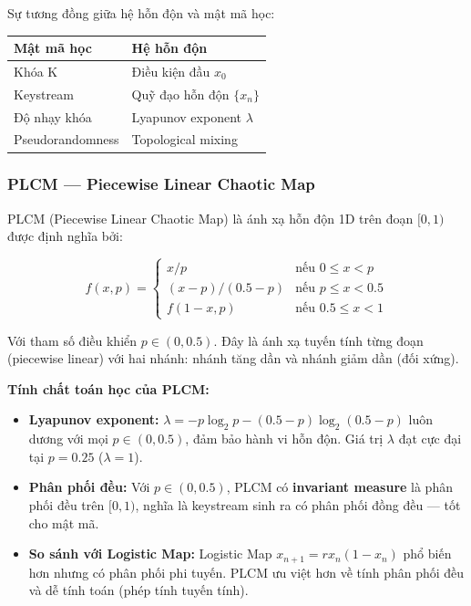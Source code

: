 Sự tương đồng giữa hệ hỗn độn và mật mã học:

\begin{center}
\begin{tabular}{ll}
\toprule
Mật mã học & Hệ hỗn độn \\
\midrule
Khóa K & Điều kiện đầu $x_0$ \\
Keystream & Quỹ đạo hỗn độn $\{x_n\}$ \\
Độ nhạy khóa & Lyapunov exponent $\lambda$ \\
Pseudorandomness & Topological mixing \\
\bottomrule
\end{tabular}
\end{center}

\subsubsection{PLCM --- Piecewise Linear Chaotic Map}

PLCM (Piecewise Linear Chaotic Map) \cite{li_plcm} là ánh xạ hỗn độn 1D trên
đoạn $[0, 1)$ được định nghĩa bởi:

\begin{equation}
f(x, p) = \begin{cases}
  x / p                    & \text{nếu } 0 \leq x < p \\
  (x - p)/(0.5 - p)        & \text{nếu } p \leq x < 0.5 \\
  f(1 - x, p)              & \text{nếu } 0.5 \leq x < 1
\end{cases}
\label{eq:plcm}
\end{equation}

Với tham số điều khiển $p \in (0, 0.5)$. Đây là ánh xạ tuyến tính từng đoạn
(piecewise linear) với hai nhánh: nhánh tăng dần và nhánh giảm dần (đối xứng).

\textbf{Tính chất toán học của PLCM:}
\begin{itemize}
  \item \textbf{Lyapunov exponent:} $\lambda = -p\log_2 p - (0.5 - p)\log_2(0.5 - p)$
        luôn dương với mọi $p \in (0, 0.5)$, đảm bảo hành vi hỗn độn.
        Giá trị $\lambda$ đạt cực đại tại $p = 0.25$ ($\lambda = 1$).

  \item \textbf{Phân phối đều:} Với $p \in (0, 0.5)$, PLCM có \textbf{invariant measure}
        là phân phối đều trên $[0, 1)$, nghĩa là keystream sinh ra có phân phối
        đồng đều --- tốt cho mật mã.

  \item \textbf{So sánh với Logistic Map:} Logistic Map $x_{n+1} = rx_n(1-x_n)$
        phổ biến hơn nhưng có phân phối phi tuyến. PLCM ưu việt hơn về
        tính phân phối đều và dễ tính toán (phép tính tuyến tính).
\end{itemize}

